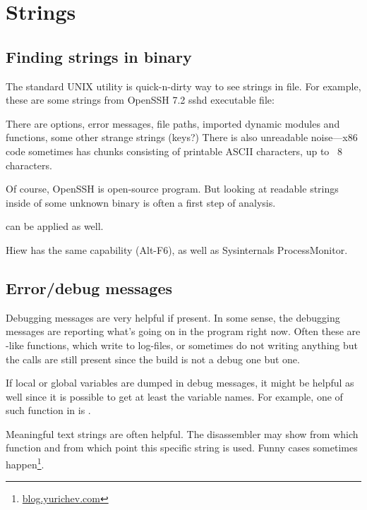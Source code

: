 \section{Strings}
\label{sec:digging_strings}



\subsection{Finding strings in binary}

The standard UNIX  utility is quick-n-dirty way to see strings in file.
For example, these are some strings from OpenSSH 7.2 sshd executable file:



There are options, error messages, file paths, imported dynamic modules and functions, some other strange strings (keys?)
There is also unreadable noise---x86 code sometimes has chunks consisting of printable ASCII characters, up to ~8 characters.

Of course, OpenSSH is open-source program.
But looking at readable strings inside of some unknown binary is often a first step of analysis.

 can be applied as well.

Hiew has the same capability (Alt-F6), as well as Sysinternals ProcessMonitor.

\subsection{Error/debug messages}

Debugging messages are very helpful if present.
In some sense, the debugging messages are reporting
what's going on in the program right now. Often these are \printf-like functions,
which write to log-files, or sometimes do not writing anything but the calls are still present 
since the build is not a debug one but  one.
\myindex{\oracle}

If local or global variables are dumped in debug messages, it might be helpful as well 
since it is possible to get at least the variable names.
For example, one of such function in \oracle is .

Meaningful text strings are often helpful.
The \IDA disassembler may show from which function and from which point this specific string is used.
Funny cases sometimes happen\footnote{\href{http://go.yurichev.com/17223}{blog.yurichev.com}}.

